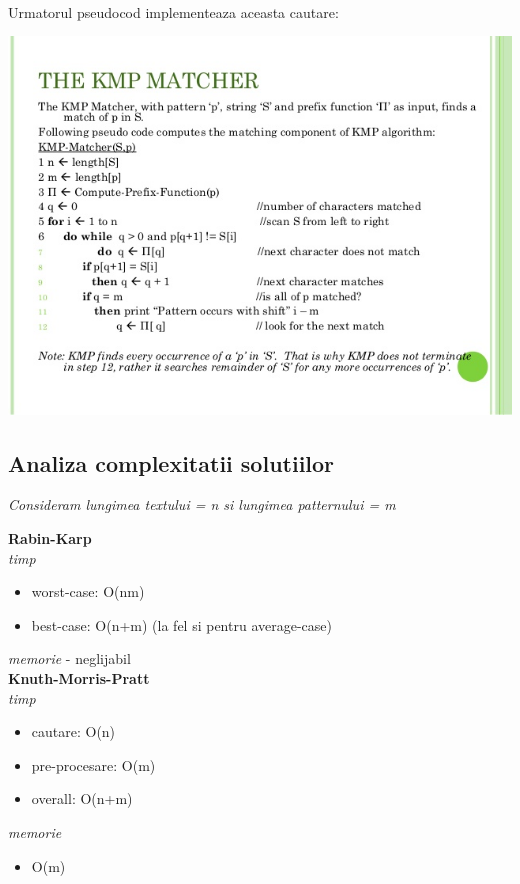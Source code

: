 \documentclass[runningheads]{llncs}
\begin{document}
\paragraph{} Urmatorul pseudocod implementeaza aceasta cautare:
\begin{center}
\includegraphics[scale=0.4]{match.jpg}
\end{center}

\subsection{Analiza complexitatii solutiilor}
\textit{Consideram lungimea textului = n si lungimea patternului = m} 

	 	\textbf{Rabin-Karp}  \\
	 	\textit{timp} 
	 	\begin{itemize}
	 		 	\item worst-case: O(nm)
	 			\item best-case: O(n+m) (la fel si pentru average-case)
	 	\end{itemize}
		\textit{memorie} - neglijabil \\

		\textbf{Knuth-Morris-Pratt} \\ 
		 \textit{timp}
		 \begin{itemize}
		 \item cautare: O(n) 
		 \item pre-procesare: O(m) 
		 \item overall: O(n+m)  
		 \end{itemize}
		 		 		 \textit{memorie}
		 \begin{itemize}
		 \item O(m) \\
		 \end{itemize}
\end{document}
